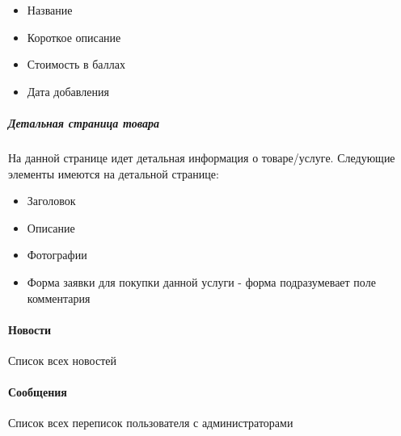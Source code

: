 \documentclass[DIV=calc, paper=a4, fontsize=11pt]{scrartcl} %
\begin{document}
\begin{itemize}
	\item Название
	\item Короткое описание
	\item Стоимость в баллах
	\item Дата добавления
\end{itemize}

\subparagraph{Детальная страница товара}
На данной странице идет детальная информация о товаре/услуге. Следующие элементы имеются на детальной странице:

\begin{itemize}
	\item Заголовок
	\item Описание
	\item Фотографии
	\item Форма заявки для покупки данной услуги - форма подразумевает поле комментария
\end{itemize}

\paragraph{Новости}
Список всех новостей

\paragraph{Сообщения}
Список всех переписок пользователя с администраторами
\end{document}
